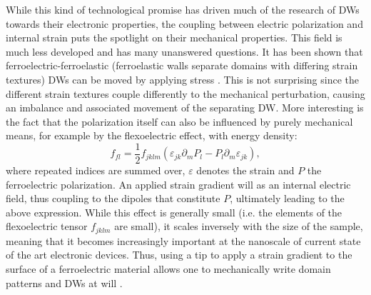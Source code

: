 While this kind of technological promise has driven much of the research of DWs towards their electronic properties, the coupling between electric polarization and internal strain puts the spotlight on their mechanical properties.
This field is much less developed and has many unanswered questions. 
It has been shown that ferroelectric-ferroelastic (ferroelastic walls separate domains with differing strain textures) DWs can be moved by applying stress \cite{Schneider2001}. This is not surprising since the different strain textures couple differently to the mechanical perturbation, causing an imbalance and associated movement of the separating DW.
More interesting is the fact that the polarization itself can also be influenced by purely mechanical means, for example by the flexoelectric effect, with energy density:
\begin{equation}
f_{fl} = \frac{1}{2}f_{jklm}(\varepsilon_{jk}\partial_mP_l-P_l\partial_m\varepsilon_{jk}),
\end{equation}
where repeated indices are summed over, $\varepsilon$ denotes the strain and $P$ the ferroelectric polarization. An applied strain gradient will as an internal electric field, thus coupling to the dipoles that constitute $P$, ultimately leading to the above expression.
While this effect is generally small (i.e. the elements of the flexoelectric tensor $f_{jklm}$ are small), it scales inversely with the size of the sample, meaning that it becomes increasingly important at the nanoscale of current state of the art electronic devices.
Thus, using a tip to apply a strain gradient to the surface of a ferroelectric material allows one to mechanically write domain patterns and DWs at will \cite{Lu2012}.

